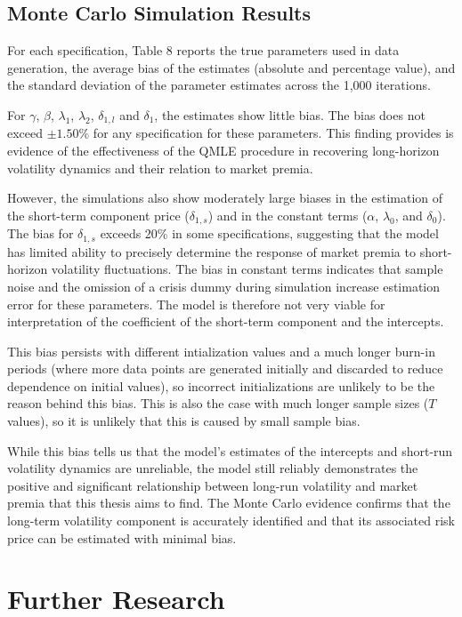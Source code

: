\documentclass[12pt]{article}
\begin{document}
\subsection{Monte Carlo Simulation Results}
For each specification, Table 8 reports the true parameters used in data generation, the average bias of the estimates (absolute and percentage value), and the standard deviation of the parameter estimates across the 1,000 iterations.\par
For $\gamma$, $\beta$, $\lambda_1$, $\lambda_2$, $\delta_{1,l}$ and $\delta_1$, the estimates show little bias. The bias does not exceed $\pm1.50\%$ for any specification for these parameters. This finding provides is evidence of the effectiveness of the QMLE procedure in recovering long-horizon volatility dynamics and their relation to market premia.\par
However, the simulations also show moderately large biases in the estimation of the short-term component price ($\delta_{1,s}$) and in the constant terms ($\alpha$, $\lambda_0$, and $\delta_0$). The bias for $\delta_{1,s}$ exceeds 20\% in some specifications, suggesting that the model has limited ability to precisely determine the response of market premia to short-horizon volatility fluctuations. The bias in constant terms indicates that sample noise and the omission of a crisis dummy during simulation increase estimation error for these parameters. The model is therefore not very viable for interpretation of the coefficient of the short-term component and the intercepts.\par
This bias persists with different intialization values and a much longer burn-in periods (where more data points are generated initially and discarded to reduce dependence on initial values), so incorrect initializations are unlikely to be the reason behind this bias. This is also the case with much longer sample sizes ($T$ values), so it is unlikely that this is caused by small sample bias.\par
While this bias tells us that the model's estimates of the intercepts and short-run volatility dynamics are unreliable, the model still reliably demonstrates the positive and significant relationship between long-run volatility and market premia that this thesis aims to find. The Monte Carlo evidence confirms that the long-term volatility component is accurately identified and that its associated risk price can be estimated with minimal bias.

\section{Further Research}
\end{document}
